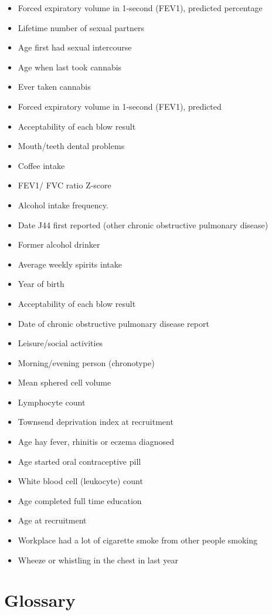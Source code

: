 \documentclass[a4paper,num-refs]{oup-contemporary}
\begin{document}
\begin{itemize}
\item Forced expiratory volume in 1-second (FEV1), predicted percentage
\item Lifetime number of sexual partners
\item Age first had sexual intercourse
\item Age when last took cannabis
\item Ever taken cannabis
\item Forced expiratory volume in 1-second (FEV1), predicted
\item Acceptability of each blow result
\item Mouth/teeth dental problems
\item Coffee intake
\item FEV1/ FVC ratio Z-score
\item Alcohol intake frequency.
\item Date J44 first reported (other chronic obstructive pulmonary disease)
\item Former alcohol drinker
\item Average weekly spirits intake
\item Year of birth
\item Acceptability of each blow result
\item Date of chronic obstructive pulmonary disease report
\item Leisure/social activities
\item Morning/evening person (chronotype)
\item Mean sphered cell volume
\item Lymphocyte count
\item Townsend deprivation index at recruitment
\item Age hay fever, rhinitis or eczema diagnosed
\item Age started oral contraceptive pill
\item White blood cell (leukocyte) count
\item Age completed full time education
\item Age at recruitment
\item Workplace had a lot of cigarette smoke from other people smoking
\item Wheeze or whistling in the chest in last year
\end{itemize}


\section{Glossary}
\end{document}
